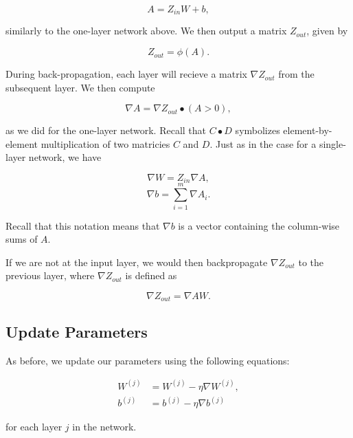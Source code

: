 $$ A = Z_{in} W + b, $$

similarly to the one-layer network above. We then output a matrix $Z_{out}$, given by

$$ Z_{out} = \phi(A).$$

During back-propagation, each layer will recieve a matrix $\nabla Z_{out}$ from
the subsequent layer. We then compute

$$ \nabla A = \nabla Z_{out} \bullet (A > 0), $$

as we did for the one-layer network. Recall that $C \bullet D$ symbolizes
element-by-element multiplication of two matricies $C$ and $D$.  Just as in the
case for a single-layer network, we have

$$ \nabla W = Z_{in} \nabla A, $$
$$ \nabla b = \sum_{i=1}^m \nabla A_i. $$

\noindent Recall that this notation means that $\nabla b$ is a vector containing the column-wise sums of $A$.

If we are not at the input layer, we would then backpropagate $\nabla Z_{out}$
to the previous layer, where $\nabla Z_{out}$ is defined as

$$ \nabla Z_{out} = \nabla A W. $$

\subsection{Update Parameters}
As before, we update our parameters using the following equations:

\begin{align*}
W^{(j)} &= W^{(j)} - \eta \nabla W^{(j)},\\
b^{(j)} &= b^{(j)} - \eta \nabla b^{(j)}
\end{align*}

for each layer $j$ in the network.
